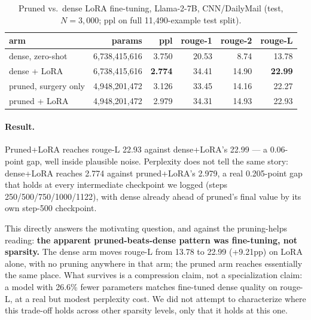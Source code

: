 \documentclass[11pt]{article}
\begin{document}
\begin{table}[htbp]
\centering
\caption{Pruned vs.\ dense LoRA fine-tuning, Llama-2-7B, CNN/DailyMail (test, $N=3{,}000$; ppl on full 11{,}490-example test split).}
\label{tab:cnndailymail}
\begin{tabular}{@{}lrrrrr@{}}
\toprule
arm & params & ppl & rouge-1 & rouge-2 & rouge-L \\
\midrule
dense, zero-shot      & 6{,}738{,}415{,}616 & 3.750 & 20.53 & 8.74  & 13.78 \\
dense + LoRA           & 6{,}738{,}415{,}616 & \textbf{2.774} & 34.41 & 14.90 & \textbf{22.99} \\
pruned, surgery only  & 4{,}948{,}201{,}472 & 3.126 & 33.45 & 14.16 & 22.27 \\
pruned + LoRA           & 4{,}948{,}201{,}472 & 2.979 & 34.31 & 14.93 & 22.93 \\
\bottomrule
\end{tabular}
\end{table}

\paragraph{Result.} Pruned+LoRA reaches rouge-L 22.93 against dense+LoRA's
22.99 --- a 0.06-point gap, well inside plausible noise. Perplexity does not
tell the same story: dense+LoRA reaches 2.774 against pruned+LoRA's 2.979, a
real 0.205-point gap that holds at every intermediate checkpoint we logged
(steps 250/500/750/1000/1122), with dense already ahead of pruned's final
value by its own step-500 checkpoint.

This directly answers the motivating question, and against the
pruning-helps reading: \textbf{the apparent pruned-beats-dense pattern was
fine-tuning, not sparsity.} The dense arm moves rouge-L from 13.78 to 22.99
(+9.21pp) on LoRA alone, with no pruning anywhere in that arm; the pruned
arm reaches essentially the same place. What survives is a compression
claim, not a specialization claim: a model with 26.6\% fewer parameters
matches fine-tuned dense quality on rouge-L, at a real but modest perplexity
cost. We did not attempt to characterize where this trade-off holds across
other sparsity levels, only that it holds at this one.
\end{document}
